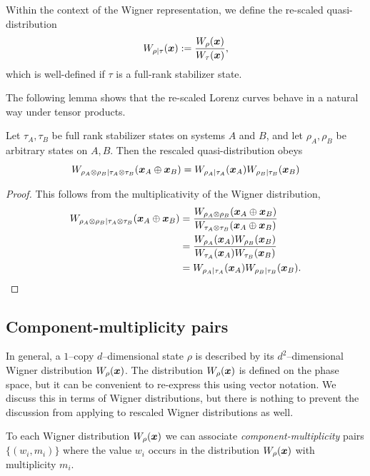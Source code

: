 \documentclass[pra,
aps,
twocolumn,
superscriptaddress,
groupedaddress,
nofootinbib,
reprint
]{revtex4-1}
\begin{document}
Within the context of the Wigner representation, we define the re-scaled quasi-distribution
\begin{equation}
	W_{\rho|\tau}(\boldsymbol{x}) := \frac{W_\rho (\boldsymbol{x}) }{ W_\tau(\boldsymbol{x})},
\end{equation}
which is well-defined if $\tau$ is a full-rank stabilizer state.

The following lemma shows that the re-scaled Lorenz curves behave in a natural way under tensor products. 
\begin{proposition}\label{prop:rescaled_multi}
	Let $\tau_A, \tau_B$ be full rank stabilizer states on systems $A$ and $B$, and let $\rho_A, \rho_B$ be arbitrary states on $A,B$. Then the rescaled quasi-distribution obeys
\begin{equation}
W_{\rho_A \otimes \rho_B | \tau_A \otimes \tau_B}(\bm{x}_A \oplus \bm{x}_B) =W_{\rho_A | \tau_A}(\boldsymbol{x}_A) W_{\rho_B | \tau_B}(\boldsymbol{x}_B)
\end{equation}
\end{proposition}
\begin{proof} This follows from the multiplicativity of the Wigner distribution,
\begin{align}
W_{\rho_A \otimes \rho_B | \tau_A \otimes \tau_B}(\bm{x}_A \oplus \bm{x}_B) &= \frac{W_{\rho_A \otimes \rho_B} (\boldsymbol{x}_A \oplus \boldsymbol{x}_B)}{W_{\tau_A \otimes \tau_B} (\boldsymbol{x}_A \oplus \boldsymbol{x}_B)}\nonumber \\
 &= \frac{W_{\rho_A } (\boldsymbol{x}_A )W_{\rho_B } (\boldsymbol{x}_B )}{W_{\tau_A } (\boldsymbol{x}_A )W_{\tau_B } (\boldsymbol{x}_B )}\nonumber \\
  &= W_{\rho_A | \tau_A}(\boldsymbol{x}_A) W_{\rho_B | \tau_B}(\boldsymbol{x}_B). \nonumber
\end{align}
\end{proof}

\subsection{Component-multiplicity pairs}
\label{app:cmpairs}

In general, a $1$--copy $d$--dimensional state $\rho$ is described by its $d^2$--dimensional Wigner distribution $\W{\rho}(\bmx)$. 
The distribution $\W{\rho}(\bmx)$ is defined on the phase space, but it can be convenient to re-express this using vector notation.
We discuss this in terms of Wigner distributions, but there is nothing to prevent the discussion from applying to rescaled Wigner distributions as well.

To each Wigner distribution $W_\rho(\boldsymbol{x})$ we can associate \emph{component-multiplicity} pairs $\{(w_i, m_i)\}$ where the value $w_i$ occurs in the distribution $W_\rho(\boldsymbol{x})$ with multiplicity $m_i$.
\end{document}
